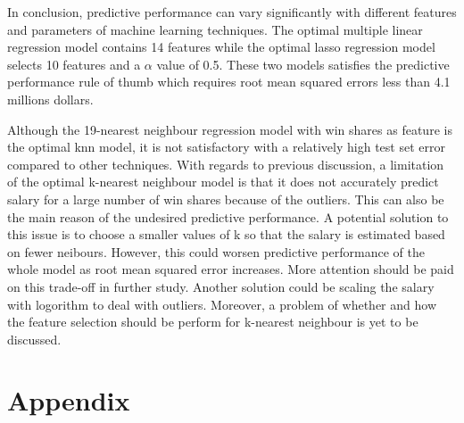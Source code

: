\documentclass[letterpaper,12pt,twoside,]{pinp}
\begin{document}
In conclusion, predictive performance can vary significantly with
different features and parameters of machine learning techniques. The
optimal multiple linear regression model contains 14 features while the
optimal lasso regression model selects 10 features and a \(\alpha\)
value of 0.5. These two models satisfies the predictive performance rule
of thumb which requires root mean squared errors less than 4.1 millions
dollars.

Although the 19-nearest neighbour regression model with win shares as
feature is the optimal knn model, it is not satisfactory with a
relatively high test set error compared to other techniques. With
regards to previous discussion, a limitation of the optimal k-nearest
neighbour model is that it does not accurately predict salary for a
large number of win shares because of the outliers. This can also be the
main reason of the undesired predictive performance. A potential
solution to this issue is to choose a smaller values of k so that the
salary is estimated based on fewer neibours. However, this could worsen
predictive performance of the whole model as root mean squared error
increases. More attention should be paid on this trade-off in further
study. Another solution could be scaling the salary with logorithm to
deal with outliers. Moreover, a problem of whether and how the feature
selection should be perform for k-nearest neighbour is yet to be
discussed.

\hypertarget{appendix}{%
\section{Appendix}\label{appendix}}
\end{document}
